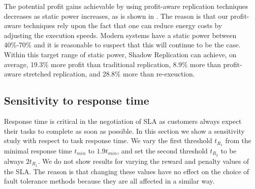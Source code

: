 The potential profit gains achievable by using profit-aware
replication techniques decreases as static power increases, as is shown
in . The reason is that our profit-aware
techniques rely upon the fact that one can reduce energy costs by
adjusting the execution speeds. Modern systems have a static power between 40\%-70\% and
it is reasonable to suspect that this will continue to be the case. Within
this target range of static power, Shadow Replication can achieve, on
average, 19.3\% more profit than traditional replication, 8.9\% more
than profit-aware stretched replication, and 28.8\% more than re-exeuction.


\subsection{Sensitivity to response time}

Response time is critical in the negotiation of SLA as customers
always expect their tasks to complete as soon as possible. In this
section we show a sensitivity study with respect to task response
time. We vary the first threshold $t_{R_1}$ from the minimal response
time $t_{min}$ to $1.9t_{min}$, and set the second threshold $t_{R_2}$
to be always $2t_{R_1}$. We do not show results for varying the reward
and penalty values of the SLA. The reason is that changing these
values have no effect on the choice of fault tolerance methods because
they are all affected in a similar way.

